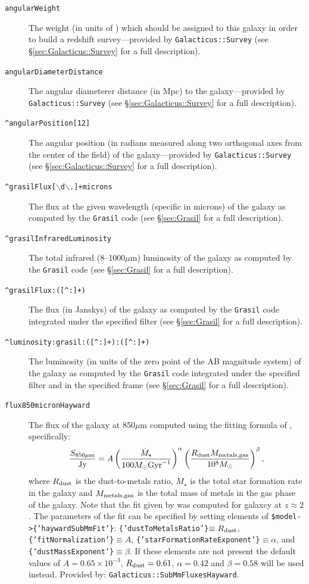 \begin{description}
 \item[{\tt angularWeight}] The weight (in units of ) which should be assigned to this galaxy in order to build a redshift survey---provided by {\tt Galacticus::Survey} (see \S\ref{sec:Galacticus::Survey} for a full description).
 \item[{\tt angularDiameterDistance}] The angular diameterer distance (in Mpc) to the galaxy---provided by {\tt Galacticus::Survey} (see \S\ref{sec:Galacticus::Survey} for a full description).
 \item[{\tt \textasciicircum angularPosition[12]}] The angular position (in radians measured along two orthogonal axes from the center of the field) of the galaxy---provided by {\tt Galacticus::Survey} (see \S\ref{sec:Galacticus::Survey} for a full description).
 \item[{\tt \textasciicircum grasilFlux[$\backslash$d$\backslash$.]+microns}] The flux at the given wavelength (specific in microns) of the galaxy as computed by the {\tt Grasil} code (see \S\ref{sec:Grasil} for a full description).
 \item[{\tt \textasciicircum grasilInfraredLuminosity}] The total infrared (8--1000$\mu$m) luminosity of the galaxy as computed by the {\tt Grasil} code (see \S\ref{sec:Grasil} for a full description).
 \item[{\tt \textasciicircum grasilFlux:([\textasciicircum :]+)}] The flux (in Janskys) of the galaxy as computed by the {\tt Grasil} code integrated under the specified filter (see \S\ref{sec:Grasil} for a full description).
 \item[{\tt \textasciicircum luminosity:grasil:([\textasciicircum :]+):([\textasciicircum :]+)}] The luminosity (in units of the zero point of the AB magnitude system) of the galaxy as computed by the {\tt Grasil} code integrated under the specified filter and in the specified frame (see \S\ref{sec:Grasil} for a full description).
 \item[{\tt flux850micronHayward}] The flux of the galaxy at 850$\mu$m computed using the fitting formula of \cite{hayward_what_2010}, specifically:
\begin{equation}
 {S_{850\mu{\rm m}} \over {\rm Jy}} = A \left({\dot{M}_\star \over 100 M_\odot \hbox{Gyr}^{-1}}\right)^\alpha \left({R_{\rm dust} M_{\rm metals,gas} \over 10^8 M_\odot}\right)^\beta,
\end{equation}
where $R_{\rm dust}$ is the dust-to-metals ratio, $\dot{M}_\star$ is the total star formation rate in the galaxy and $M_{\rm metals,gas}$ is the total mass of metals in the gas phase of the galaxy. Note that the fit given by \cite{hayward_what_2010} was computed for galaxcy at $z\approx 2$. The parameters of the fit can be specified by setting elements of {\tt \$model-\textgreater\{'haywardSubMmFit'\}}: {\tt \{'dustToMetalsRatio'\}}$\equiv R_{\rm dust}$, {\tt \{'fitNormalization'\}}$\equiv A$, {\tt \{'starFormationRateExponent'\}}$\equiv \alpha$, and {\tt \{'dustMassExponent'\}}$\equiv \beta$. If these elements are not present the default values of $A=0.65\times 10^{-3}$, $R_{\rm dust}=0.61$, $\alpha=0.42$ and $\beta = 0.58$ \cite{hayward_what_2010} will be used instead. Provided by: {\tt Galacticus::SubMmFluxesHayward}.

\end{description}
